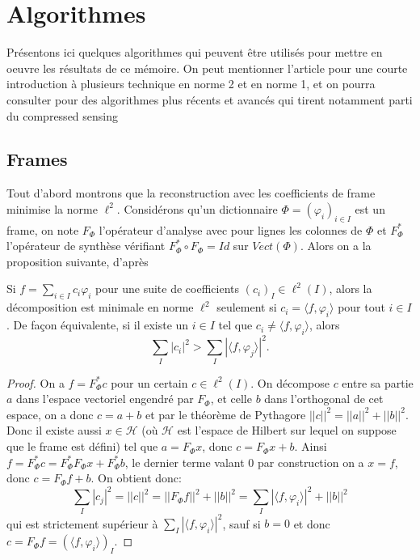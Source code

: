 \section{Algorithmes}
Présentons ici quelques algorithmes qui peuvent être utilisés pour mettre en oeuvre les résultats de ce mémoire. On peut mentionner l'article \cite{ChenDonoho} pour une courte introduction à plusieurs technique en norme 2 et en norme 1, et on pourra consulter \cite{foucartbook} pour des algorithmes plus récents et avancés qui tirent notamment parti du compressed sensing
\subsection{Frames}\label{recframe}
Tout d'abord montrons que la reconstruction avec les coefficients de frame minimise la norme $\ell^2$.
Considérons qu'un dictionnaire $\Phi=(\varphi_i)_{i\in I}$ est un frame, on note $F_\Phi$ l'opérateur d'analyse avec pour lignes les colonnes de $\Phi$ et $F_\Phi^*$ l'opérateur de synthèse vérifiant $F_\Phi^* \circ F_\Phi =Id$ sur $Vect(\Phi)$.
Alors on a la proposition suivante, d'après \cite{daubbook}
\begin{proposition}\label{bestframe}
	Si $f =\sum_{i \in I} c_i \varphi_i$ pour une suite de coefficients $(c_i)_I \in \ell^2(I)$,
	alors la décomposition est minimale en norme $\ell^2$ seulement si $c_i = \langle f, \varphi_i \rangle$ pour tout $i\in I$.
	\newline
	De façon équivalente, si il existe un $i \in I$ tel que $c_i \neq \langle f, \varphi_i \rangle$, alors
	\begin{equation}
		\sum_I |c_i|^2 > \sum_I |\langle f, \varphi_j \rangle |^2.
	\end{equation}
\end{proposition}
\begin{proof}
	On a $f=F_\Phi^* c$ pour un certain $c\in\ell^2(I)$.
	On décompose $c$ entre sa partie $a$ dans l'espace vectoriel engendré par $F_\Phi$, et celle $b$ dans l'orthogonal de cet espace, on a donc $c=a+b$ et par le théorème de Pythagore $||c||^2 = ||a||^2 + ||b||^2$.
	Donc il existe aussi $x\in \mathcal{H}$ (où $\mathcal{H}$ est l'espace de Hilbert sur lequel on suppose que le frame est défini) tel que $a=F_\Phi x$, donc $c = F_\Phi x + b$.
	Ainsi $f = F_\Phi ^* c = F_\Phi^* F_\Phi x + F_\Phi^* b$, le dernier terme valant 0 par construction on a $x=f$, donc $c = F_\Phi f + b$. On obtient donc:
	\begin{equation}
		\sum_I |c_j|^2 = ||c||^2 = ||F_\Phi f||^2 + ||b||^2 = \sum_I |\langle f, \varphi_i \rangle|^2 + ||b||^2
	\end{equation}
	qui est strictement supérieur à $\sum_I |\langle f, \varphi_i \rangle |^2$, sauf si $b=0$ et donc $c=F_\Phi f =(\langle f, \varphi_i \rangle)_I$.
\end{proof}

